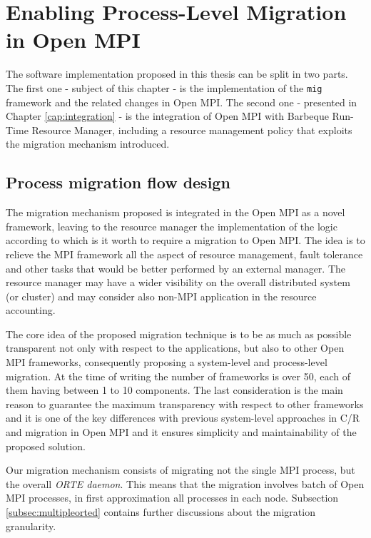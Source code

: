 \chapter{Enabling Process-Level Migration in Open MPI}
\label{cap:design}

The software implementation proposed in this thesis can be split in two parts.
The first one - subject of this chapter - is the implementation of the
\texttt{mig} framework and the related changes in Open MPI. The second one -
presented in Chapter \ref{cap:integration} - is the
integration of Open MPI with Barbeque Run-Time Resource Manager, including a
resource management policy that exploits the migration mechanism introduced.

\section{Process migration flow design}

The migration mechanism proposed is integrated in the Open MPI as a novel
framework, leaving to the
resource manager the implementation of the logic according to which is it
worth to require a migration to Open MPI. The idea is
to relieve the MPI framework all the aspect of resource management, fault
tolerance and other tasks that would be better performed by an external
manager. The resource manager may have a wider visibility on the
overall distributed system (or cluster) and may consider also non-MPI
application in the resource accounting.

The core idea of the proposed migration technique is to be as much as
possible transparent not only with respect to the applications, but also to
other Open MPI frameworks, consequently proposing a system-level and
process-level migration. At the time of writing the number of frameworks is
over 50, each of them having between 1 to 10 components. The last consideration
is the main reason to guarantee the maximum
transparency with respect to other frameworks and it is one of the key
differences
with previous system-level approaches in C/R and migration in Open MPI and it
ensures simplicity and maintainability of the proposed solution.

Our migration mechanism consists of migrating not the single MPI process, but the
overall \emph{ORTE daemon}. This means that the migration involves batch of Open MPI
processes, in first approximation all processes in each node. Subsection 
\ref{subsec:multipleorted} contains further discussions about the migration
granularity. 

